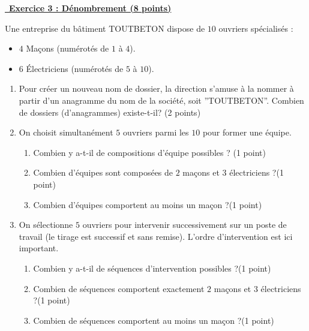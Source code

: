 \documentclass[a4paper,11pt]{article}
\begin{document}
\underline {\, \bf{Exercice 3 : Dénombrement (8 points)}}\\
\medskip


Une entreprise du bâtiment TOUTBETON dispose de $10$ ouvriers spécialisés :
\begin{itemize}
    \item $4$ Maçons (numérotés de $1$ à $4$).
    \item $6$ Électriciens (numérotés de $5$ à $10$).
\end{itemize}

\begin{enumerate}
\item Pour créer un nouveau nom de dossier, la direction s'amuse à la nommer à partir d'un anagramme du nom de la société, soit ''TOUTBETON''. Combien de dossiers (d'anagrammes) existe-t-il? (2 points)
    \item 
On choisit simultanément $5$ ouvriers parmi les $10$ pour former une équipe.
\begin{enumerate}
    \item Combien y a-t-il de compositions d'équipe possibles ? (1 point)
    \item Combien d'équipes sont composées de $2$ maçons et $3$ électriciens ?(1 point)
    \item  Combien d'équipes comportent au moins un maçon ?(1 point)
\end{enumerate}

\item
On sélectionne $5$ ouvriers pour intervenir successivement sur un poste de travail (le tirage est successif et sans remise). L'ordre d'intervention est ici important.
\begin{enumerate}
    \item Combien y a-t-il de séquences d'intervention possibles ?(1 point)
    \item Combien de séquences comportent exactement $2$ maçons et $3$ électriciens ?(1 point)
    \item Combien de séquences comportent au moins un maçon ?(1 point)
\end{enumerate}


\end{enumerate}

%
%
%

\end{document}
